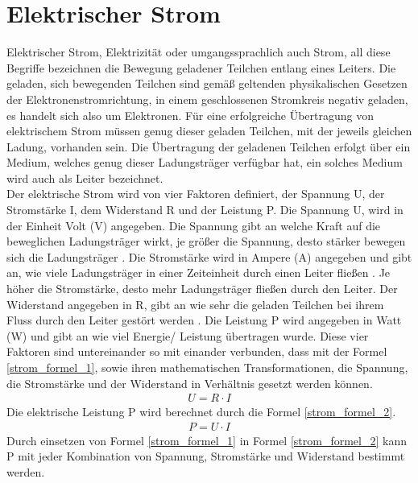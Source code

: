 \section{Elektrischer Strom}
Elektrischer Strom, Elektrizität oder umgangssprachlich auch Strom, all diese Begriffe bezeichnen die Bewegung geladener Teilchen entlang eines Leiters. Die geladen, sich bewegenden Teilchen sind gemäß geltenden physikalischen Gesetzen der Elektronenstromrichtung, in einem geschlossenen Stromkreis negativ geladen, es handelt sich also um Elektronen. Für eine erfolgreiche Übertragung von elektrischem Strom müssen genug dieser geladen Teilchen, mit der jeweils gleichen Ladung, vorhanden sein. Die Übertragung der geladenen Teilchen erfolgt über ein Medium, welches genug dieser Ladungsträger verfügbar hat, ein solches Medium wird auch als Leiter bezeichnet.\\
Der elektrische Strom wird von vier Faktoren definiert, der Spannung U, der Stromstärke I, dem Widerstand R und der Leistung P. Die Spannung U, wird in der Einheit Volt (V) angegeben. Die Spannung gibt an welche Kraft auf die beweglichen Ladungsträger wirkt, je größer die Spannung, desto stärker bewegen sich die Ladungsträger \cite{spannung_1}. Die Stromstärke wird in Ampere (A) angegeben und gibt an, wie viele Ladungsträger in einer Zeiteinheit durch einen Leiter fließen \cite{stromstaerke_1}. Je höher die Stromstärke, desto mehr Ladungsträger fließen durch den Leiter. Der Widerstand angegeben in R, gibt an wie sehr die geladen Teilchen bei ihrem Fluss durch den Leiter gestört werden \cite{widerstand_1}. Die Leistung P wird angegeben in Watt (W) und gibt an wie viel Energie/ Leistung übertragen wurde. Diese vier Faktoren sind untereinander so mit einander verbunden, dass mit der Formel \ref{strom_formel_1}, sowie ihren mathematischen Transformationen, die Spannung, die Stromstärke und der Widerstand in Verhältnis gesetzt werden können.
\begin{align}
	U  =  R \cdot I
	\label{strom_formel_1}
\end{align}
Die elektrische Leistung P wird berechnet durch die Formel \ref{strom_formel_2}.
\begin{align}
	P = U \cdot I
	\label{strom_formel_2}
\end{align}
Durch einsetzen von Formel \ref{strom_formel_1} in Formel \ref{strom_formel_2} kann P mit jeder Kombination von Spannung, Stromstärke und Widerstand bestimmt werden.\\
